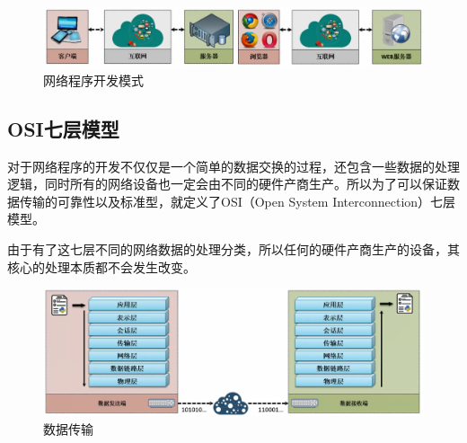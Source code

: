 \begin{figure}[H]
	\centering
	\includegraphics[]{img/C12/12-1/2.png}
	\caption{网络程序开发模式}
\end{figure}

\vspace{0.5cm}

\subsection{OSI七层模型}

对于网络程序的开发不仅仅是一个简单的数据交换的过程，还包含一些数据的处理逻辑，同时所有的网络设备也一定会由不同的硬件产商生产。所以为了可以保证数据传输的可靠性以及标准型，就定义了OSI（Open System Interconnection）七层模型。

\begin{table}[H]
	\centering
	\caption{OSI七层模型}
\end{table}

由于有了这七层不同的网络数据的处理分类，所以任何的硬件产商生产的设备，其核心的处理本质都不会发生改变。

\begin{figure}[H]
	\centering
	\includegraphics[scale=0.6]{img/C12/12-1/3.png}
	\caption{数据传输}
\end{figure}

